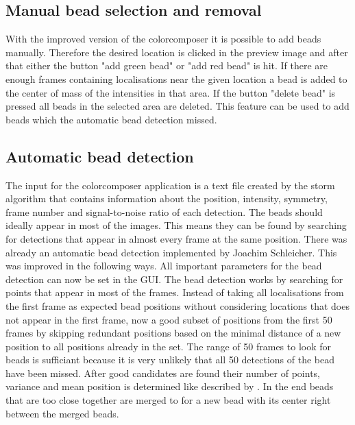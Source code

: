 \subsection{Manual bead selection and removal}
With the improved version of the colorcomposer it is possible to add beads manually. Therefore the desired location is clicked in the preview image and after that either the button "add green bead" or "add red bead" is hit. If there are enough frames containing localisations near the given location a bead is added to the center of mass of the intensities in that area. If the button "delete bead" is pressed all beads in the selected area are deleted.\newline
This feature can be used to add beads which the automatic bead detection missed.
\subsection{Automatic bead detection}
The input for the colorcomposer application is a text file created by the storm
algorithm that contains information about the position, intensity, symmetry,
frame number and signal-to-noise ratio of each detection. The beads should
ideally appear in most of the images. This means they can be found by searching for
detections that appear in almost every frame at the same position.\newline
There was already an automatic bead detection implemented by Joachim Schleicher. This was improved in the following ways.\newline
All important parameters for the bead detection can now be set in the GUI. The bead detection works by searching for points that appear in most of the frames. Instead of taking all localisations from the first frame as expected bead positions without considering locations that does not appear in the first frame, now a good subset of positions from the first 50 frames by skipping redundant positions based on the minimal distance of a new position to all positions already in the set. The range of 50 frames to look for beads is sufficiant because it is very unlikely that all 50 detections of the bead have been missed.\newline
After good candidates are found their number of points, variance and mean position is determined like described by \cite{MAJoachim}.\newline
In the end beads that are too close together are merged to for a new bead with its center right between the merged beads.

